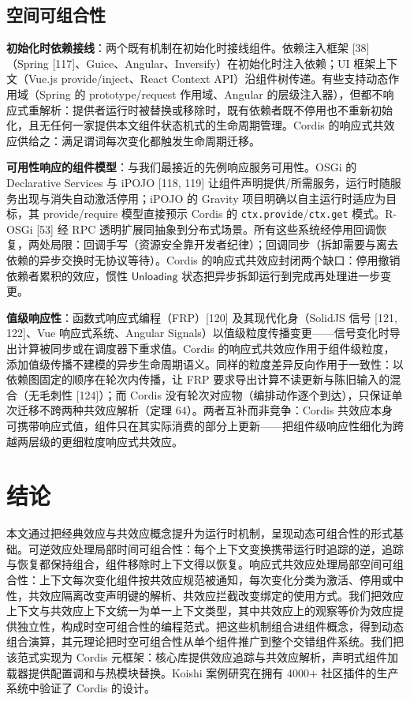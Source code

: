 \documentclass[11pt,a4paper]{article}
\theoremstyle{plain}
\theoremstyle{definition}
\theoremstyle{remark}
\begin{document}
\subsection{空间可组合性}

\textbf{初始化时依赖接线}：两个既有机制在初始化时接线组件。依赖注入框架 [38]（Spring [117]、Guice、Angular、Inversify）在初始化时注入依赖；UI 框架上下文（Vue.js provide/inject、React Context API）沿组件树传递。有些支持动态作用域（Spring 的 prototype/request 作用域、Angular 的层级注入器），但都不响应式重解析：提供者运行时被替换或移除时，既有依赖者既不停用也不重新初始化，且无任何一家提供本文组件状态机式的生命周期管理。Cordis 的响应式共效应供给之：满足谓词每次变化都触发生命周期迁移。

\textbf{可用性响应的组件模型}：与我们最接近的先例响应服务可用性。OSGi 的 Declarative Services 与 iPOJO [118, 119] 让组件声明提供/所需服务，运行时随服务出现与消失自动激活停用；iPOJO 的 Gravity 项目明确以自主运行时适应为目标，其 provide/require 模型直接预示 Cordis 的 \texttt{ctx.provide}/\texttt{ctx.get} 模式。R-OSGi [53] 经 RPC 透明扩展同抽象到分布式场景。所有这些系统经停用回调恢复，两处局限：回调手写（资源安全靠开发者纪律）；回调同步（拆卸需要与离去依赖的异步交换时无协议等待）。Cordis 的响应式共效应封闭两个缺口：停用撤销依赖者累积的效应，惯性 $\mathsf{Unloading}$ 状态把异步拆卸运行到完成再处理进一步变更。

\textbf{值级响应性}：函数式响应式编程（FRP）[120] 及其现代化身（SolidJS 信号 [121, 122]、Vue 响应式系统、Angular Signals）以值级粒度传播变更——信号变化时导出计算被同步或在调度器下重求值。Cordis 的响应式共效应作用于组件级粒度，添加值级传播不建模的异步生命周期语义。同样的粒度差异反向作用于一致性：以依赖图固定的顺序在轮次内传播，让 FRP 要求导出计算不读更新与陈旧输入的混合（无毛刺性 [124]）；而 Cordis 没有轮次对应物（编排动作逐个到达），只保证单次迁移不跨两种共效应解析（定理 64）。两者互补而非竞争：Cordis 共效应本身可携带响应式值，组件只在其实际消费的部分上更新——把组件级响应性细化为跨越两层级的更细粒度响应式共效应。

\section{结论}

本文通过把经典效应与共效应概念提升为运行时机制，呈现动态可组合性的形式基础。可逆效应处理局部时间可组合性：每个上下文变换携带运行时追踪的逆，追踪与恢复都保持组合，组件移除时上下文得以恢复。响应式共效应处理局部空间可组合性：上下文每次变化组件按共效应规范被通知，每次变化分类为激活、停用或中性，共效应隔离改变声明键的解析、共效应拦截改变绑定的使用方式。我们把效应上下文与共效应上下文统一为单一上下文类型，其中共效应上的观察等价为效应提供独立性，构成时空可组合性的编程范式。把这些机制组合进组件概念，得到动态组合演算，其元理论把时空可组合性从单个组件推广到整个交错组件系统。我们把该范式实现为 Cordis 元框架：核心库提供效应追踪与共效应解析，声明式组件加载器提供配置调和与热模块替换。Koishi 案例研究在拥有 4000+ 社区插件的生产系统中验证了 Cordis 的设计。
\end{document}
